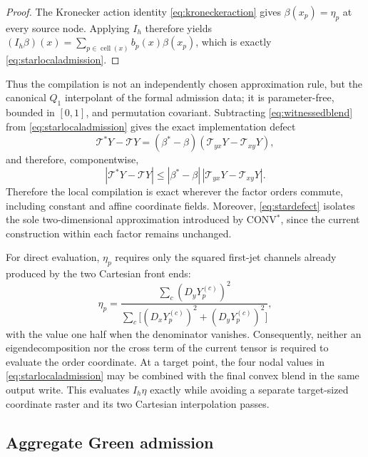 \documentclass[journal]{IEEEtran}
\newcommand{\Tcal}{\mathcal{T}}
\begin{document}
\begin{proof}
The Kronecker action identity \eqref{eq:kroneckeraction} gives
\(\beta(x_p)=\eta_p\) at every source node. Applying \(I_h\) therefore yields
\((I_h\beta)(x)=\sum_{p\in\operatorname{cell}(x)}b_p(x)\beta(x_p)\), which is
exactly \eqref{eq:starlocaladmission}.
\end{proof}

Thus the compilation is not an independently chosen approximation rule, but
the canonical \(Q_1\) interpolant of the formal admission data; it is
parameter-free, bounded in \([0,1]\), and permutation covariant. Subtracting
\eqref{eq:witnessedblend} from \eqref{eq:starlocaladmission} gives the exact
implementation defect
\begin{equation}
 \Tcal^*Y-\Tcal Y
 = (\beta^*-\beta)(\Tcal_{yx}Y-\Tcal_{xy}Y),
 \label{eq:stardefect}
\end{equation}
and therefore, componentwise,
\begin{equation}
 |\Tcal^*Y-\Tcal Y|
 \leq |\beta^*-\beta|\,|\Tcal_{yx}Y-\Tcal_{xy}Y|.
 \label{eq:stardefectbound}
\end{equation}
Therefore the local compilation is exact wherever the factor orders commute,
including constant and affine coordinate fields. Moreover,
\eqref{eq:stardefect} isolates the sole two-dimensional approximation
introduced by CONV$^{*}$, since the current construction within each factor
remains unchanged.

For direct evaluation, \(\eta_p\) requires only the squared first-jet
channels already produced by the two Cartesian front ends:
\begin{equation}
 \eta_p=
 \frac{\sum_c(D_yY_p^{(c)})^2}
 {\sum_c\bigl[(D_xY_p^{(c)})^2+(D_yY_p^{(c)})^2\bigr]},
 \label{eq:stardirecteta}
\end{equation}
with the value one half when the denominator vanishes. Consequently, neither
an eigendecomposition nor the cross term of the current tensor is required
to evaluate the order coordinate. At a target point, the four nodal values
in \eqref{eq:starlocaladmission} may be combined with the final convex blend
in the same output write. This evaluates \(I_h\eta\) exactly while avoiding a
separate target-sized coordinate raster and its two Cartesian interpolation
passes.

\subsection{Aggregate Green admission}
\end{document}
